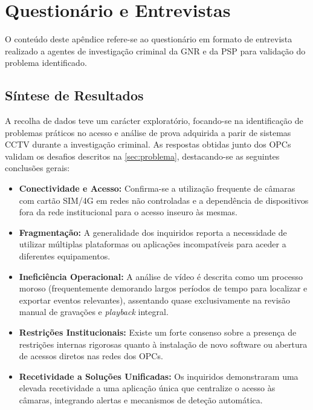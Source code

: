 
\chapter{Questionário e Entrevistas} %

\label{AppendixA} %

O conteúdo deste apêndice refere-se ao questionário em formato de entrevista realizado a agentes de investigação criminal da \gls{GNR} e da \gls{PSP} para validação do problema identificado.

\section{Síntese de Resultados}

A recolha de dados teve um carácter exploratório, focando-se na identificação de problemas práticos no acesso e análise de prova adquirida a parir de sistemas \gls{CCTV} durante a investigação criminal. As respostas obtidas junto dos \glspl{OPC} validam os desafios descritos na \autoref{sec:problema}, destacando-se as seguintes conclusões gerais:

\begin{itemize}
    \item \textbf{Conectividade e Acesso:} Confirma-se a utilização frequente de câmaras com cartão SIM/4G em redes não controladas e a dependência de dispositivos fora da rede institucional para o acesso inseuro às mesmas.
    \item \textbf{Fragmentação:} A generalidade dos inquiridos reporta a necessidade de utilizar múltiplas plataformas ou aplicações incompatíveis para aceder a diferentes equipamentos.
    \item \textbf{Ineficiência Operacional:} A análise de vídeo é descrita como um processo moroso (frequentemente demorando largos períodos de tempo para localizar e exportar eventos relevantes), assentando quase exclusivamente na revisão manual de gravações e \textit{playback} integral.
    \item \textbf{Restrições Institucionais:} Existe um forte consenso sobre a presença de restrições internas rigorosas quanto à instalação de novo software ou abertura de acessos diretos nas redes dos \glspl{OPC}.
    \item \textbf{Recetividade a Soluções Unificadas:} Os inquiridos demonstraram uma elevada recetividade a uma aplicação única que centralize o acesso às câmaras, integrando alertas e mecanismos de deteção automática.
\end{itemize}

